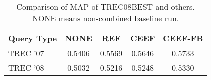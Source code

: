 \begin{table}[h]
	\centering
	\begin{tabular}{lS[tabnumalign=centre,tabformat=1.4,decimalsymbol=comma]S[tabnumalign=centre,tabformat=1.4,decimalsymbol=comma]S[tabnumalign=centre,tabformat=1.4,decimalsymbol=comma]S[tabnumalign=centre,tabformat=1.4,decimalsymbol=comma]}
		\toprule
		Query Type & {NONE} & {REF} & {CEEF} & {CEEF-FB}\\
		\midrule
		TREC '07 & 0.5406 & 0.5569 & 0.5646 & 0.5733\\
		TREC '08 & 0.5032 & 0.5216 & 0.5248 & 0.5330\\
		\bottomrule
	\end{tabular}
	\caption{Comparison of MAP of TREC08BEST and others. NONE means non-combined baseline run.}
	\cite{paper:Na}
\end{table}
